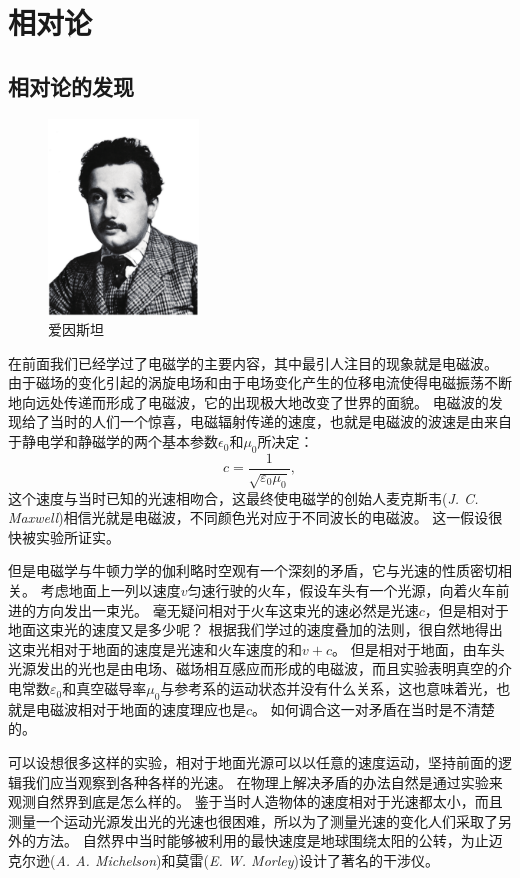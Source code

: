 
\chapter{相对论}

\section{相对论的发现}
 \begin{figure}
 \includegraphics[width=4cm]{images/relativity-4.pdf} 
 \caption{爱因斯坦}
 \end{figure}
在前面我们已经学过了电磁学的主要内容，其中最引人注目的现象就是电磁波。
由于磁场的变化引起的涡旋电场和由于电场变化产生的位移电流使得电磁振荡不断地向远处传递而形成了电磁波，它的出现极大地改变了世界的面貌。
电磁波的发现给了当时的人们一个惊喜，电磁辐射传递的速度，也就是电磁波的波速是由来自于静电学和静磁学的两个基本参数$\epsilon_0$和$\mu_0$所决定：
\begin{equation}
c=\frac{1}{\sqrt{\varepsilon_0\mu_0}},
\end{equation}
这个速度与当时已知的光速相吻合，这最终使电磁学的创始人麦克斯韦({\it J. C. Maxwell})相信光就是电磁波，不同颜色光对应于不同波长的电磁波。
这一假设很快被实验所证实。

但是电磁学与牛顿力学的伽利略时空观有一个深刻的矛盾，它与光速的性质密切相关。
考虑地面上一列以速度$v$匀速行驶的火车，假设车头有一个光源，向着火车前进的方向发出一束光。
毫无疑问相对于火车这束光的速必然是光速$c$，但是相对于地面这束光的速度又是多少呢？
根据我们学过的速度叠加的法则，很自然地得出这束光相对于地面的速度是光速和火车速度的和$v+c$。
但是相对于地面，由车头光源发出的光也是由电场、磁场相互感应而形成的电磁波，而且实验表明真空的介电常数$\varepsilon_0$和真空磁导率$\mu_0$与参考系的运动状态并没有什么关系，这也意味着光，也就是电磁波相对于地面的速度理应也是$c$。
如何调合这一对矛盾在当时是不清楚的。

可以设想很多这样的实验，相对于地面光源可以以任意的速度运动，坚持前面的逻辑我们应当观察到各种各样的光速。
在物理上解决矛盾的办法自然是通过实验来观测自然界到底是怎么样的。
鉴于当时人造物体的速度相对于光速都太小，而且测量一个运动光源发出光的光速也很困难，所以为了测量光速的变化人们采取了另外的方法。
自然界中当时能够被利用的最快速度是地球围绕太阳的公转，为止迈克尔逊({\it A. A. Michelson})和莫雷({\it E. W. Morley})设计了著名的干涉仪。


